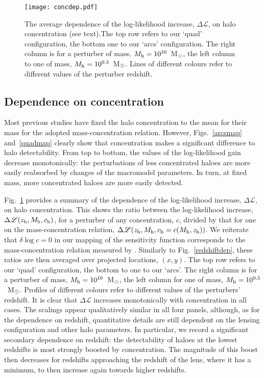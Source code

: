 \documentclass[a4paper, fleqn, usenatbib, useAMS]{mnras}
\def\DL{\Delta\mathscr{L}}
\begin{document}
\begin{figure}
\centering
\texttt{[image: concdep.pdf]}
\caption{The average dependence of the log-likelihood increase, $\DL$, on halo concentration (see text).The top row refers to our `quad' configuration,
the bottom one to our `arcs' configuration. The right column is for a perturber of
mass, $M_{\rm h}=10^{10}$~M$_{\rm \odot}$, the left column to one of mass,
$M_{\rm h}=10^{9.5}$~M$_{\rm \odot}$. Lines of different colours
refer to different values of the perturber  
 redshift. }
\label{concdep}
\end{figure}

\subsection{Dependence on concentration}
\label{concentrationdependence0}

Most previous studies have fixed the halo concentration to 
the mean for their mass for the adopted mass-concentration relation. However, Figs.~\ref{arcsmap} and~\ref{quadmap} clearly show that concentration 
makes a significant difference to halo detectability. From top to bottom, the values of the log-likelihood
gain decrease monotonically: the perturbations of less concentrated haloes are more easily reabsorbed 
by changes of the macromodel parameters. In turn, at fixed mass, more concentrated
haloes are more easily detected. 

Fig.~\ref{concdep} provides a summary of the dependence of the log-likelihood 
increase, $\DL$, on halo concentration. This shows the ratio between the log-likelihood increase,
$\DL(z_{\rm h},M_{\rm h},c_{\rm h})$, for a perturber of any concentration, $c$, divided by that for one on the mass-concentration 
relation, $\DL(z_{\rm h},M_{\rm h},c_{\rm h}=c(M_{\rm h}, z_{\rm h}))$. We reiterate that
$\delta \log c=0$ in our mapping of the sensitivity function corresponds to the mass-concentration relation measured by \citet{Ludlow2016}. Similarly to Fig.~\ref{redshiftdep},
these ratios are then averaged over projected locations, $(x,y)$. The top row refers to our `quad' configuration,
the bottom to one to our `arcs'. The right column is for a perturber
of mass, $M_{\rm h}=10^{10}$~M$_{\rm \odot}$, the left column
for one of mass, $M_{\rm h}=10^{9.5}$~M$_{\rm \odot}$. Profiles of different colours refer to different values of the perturbers' 
 redshift. It is clear that $\DL$ increases monotonically with concentration in all cases. 
 The scalings appear qualitatively similar in all four panels, although, as for the dependence on redshift,
 quantitative details are still dependent on the lensing configuration and other halo parameters. 
 In particular, we record a significant secondary dependence on redshift: the detectability of haloes
 at the lowest redshifts is most strongly boosted by concentration. The magnitude of this boost
 then decreases for redshifts approaching the redshift of the lens, where it has a minimum, to then increase again towards higher redshifts.  
 
\end{document}
